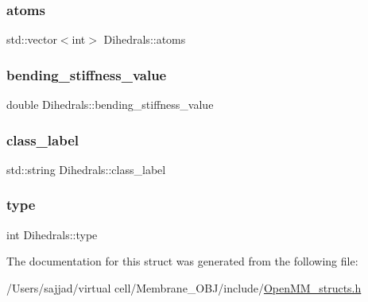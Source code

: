 \subsubsection{\texorpdfstring{atoms}{atoms}}
{\footnotesize\ttfamily std\+::vector$<$int$>$ Dihedrals\+::atoms}

\mbox{\label{structDihedrals_aadecae129e161803f43e86d153466b61}} 
\subsubsection{\texorpdfstring{bending\_stiffness\_value}{bending\_stiffness\_value}}
{\footnotesize\ttfamily double Dihedrals\+::bending\+\_\+stiffness\+\_\+value}

\mbox{\label{structDihedrals_a43e78eca1517f607d420ddc3387adc42}} 
\subsubsection{\texorpdfstring{class\_label}{class\_label}}
{\footnotesize\ttfamily std\+::string Dihedrals\+::class\+\_\+label}

\mbox{\label{structDihedrals_aec015ae7812fd13d61a9ff90645c104b}} 
\subsubsection{\texorpdfstring{type}{type}}
{\footnotesize\ttfamily int Dihedrals\+::type}



The documentation for this struct was generated from the following file\+:\begin{DoxyCompactItemize}
\item 
/\+Users/sajjad/virtual cell/\+Membrane\+\_\+\+O\+B\+J/include/\mbox{\hyperlink{OpenMM__structs_8h}{Open\+M\+M\+\_\+structs.\+h}}\end{DoxyCompactItemize}
